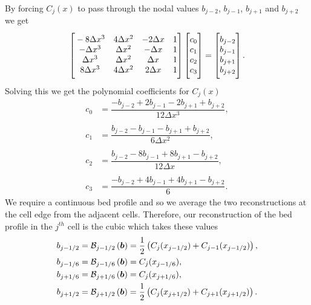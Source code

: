 By forcing $C_j(x)$ to pass through the nodal values $b_{j-2}$, $b_{j-1}$, $b_{j+1}$ and $b_{j+2}$ we get
\begin{equation*}
\begin{bmatrix}
\TM -8\Delta x^3 & 4\Delta x^2  & -2\Delta x & 1\\
-\Delta x^3 & \Delta x^2  &-\Delta x & 1\\
\Delta x^3 & \Delta x^2  & \Delta x & 1\\
8\Delta x^3 & 4\Delta x^2  & 2\Delta x & 1 \BM 
\end{bmatrix}
\begin{bmatrix}
 \TM c_0 \\ c_1 \\ c_2 \\ c_3  \BM\end{bmatrix} =  \begin{bmatrix}
 \TM b_{j-2} \\ b_{j-1}\\ b_{j+1} \\ b_{j+2} \BM
\end{bmatrix}.
\end{equation*}
Solving this we get the polynomial coefficients for $C_j(x)$
\begin{align*}
c_0 &=  \dfrac{-b_{j-2} + 2b_{j-1} - 2 b_{j+1} + b_{j+2}}{12 \Delta x^3},\\ \\
c_1 &=  \dfrac{b_{j-2} - b_{j-1} - b_{j+1} + b_{j+2}}{6 \Delta x^2},\\ \\
c_2 &=  \dfrac{b_{j-2} - 8b_{j-1} + 8 b_{j+1} - b_{j+2}}{12 \Delta x},\\ \\
c_3 &=  \dfrac{-b_{j-2}  + 4b_{j-1} + 4 b_{j+1} - b_{j+2}}{6}.
\end{align*}
We require a continuous bed profile and so we average the two reconstructions at the cell edge from the adjacent cells. Therefore, our reconstruction of the bed profile in the $j^{th}$ cell is the cubic which takes these values
\begin{subequations}
\begin{align}
b_{j-1/2} &=  \mathcal{B}_{j-1/2}\left(\boldsymbol{b}\right) =  \frac{1}{2}\left( C_j(x_{j-1/2}) + C_{j-1}(x_{j-1/2})\right),\\
b_{j-1/6} &=  \mathcal{B}_{j-1/6}\left(\boldsymbol{b}\right) =  C_j(x_{j-1/6}),\\
b_{j+1/6} &=  \mathcal{B}_{j+1/6}\left(\boldsymbol{b}\right) =  C_j(x_{j+1/6}),\\
b_{j+1/2} &=  \mathcal{B}_{j+1/2}\left(\boldsymbol{b}\right) =  \frac{1}{2}\left( C_j(x_{j+1/2}) + C_{j+1}(x_{j+1/2})\right).
\end{align}
\label{eqn:BedReconDef}
\end{subequations}



